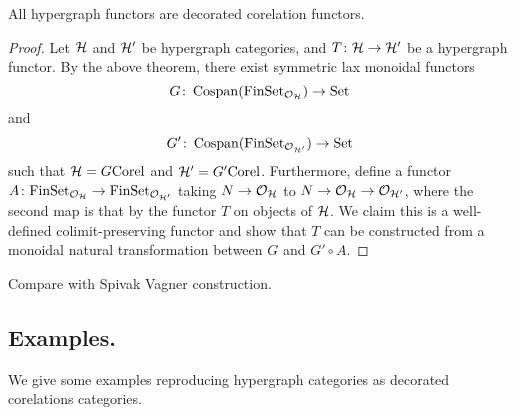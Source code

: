 \begin{theorem}
  All hypergraph functors are decorated corelation functors.
\end{theorem}
\begin{proof}
  Let $\mathcal H$ and $\mathcal H'$ be hypergraph categories, and $T{\colon} \mathcal H \to \mathcal
  H'$ be a hypergraph functor. By the above theorem, there exist symmetric lax
  monoidal functors 
  \[
    G{\colon} \operatorname{{Cospan}}(\mathrm{FinSet}_{\mathcal O_{\mathcal H}}) \to \mathrm{Set} 
  \]
  and 
  \[
    G'{\colon} \operatorname{{Cospan}}(\mathrm{FinSet}_{\mathcal O_{\mathcal H'}}) \to \mathrm{Set} 
  \]
  such that $\mathcal H = G\mathrm{Corel}$ and $\mathcal H' = G'\mathrm{Corel}$.
  Furthermore, define a functor $A{\colon} \mathrm{FinSet}_{\mathcal O_{\mathcal H}} \to \mathrm{FinSet}_{\mathcal
    O_{\mathcal H'}}$ taking $N \to \mathcal O_{\mathcal H}$ to $N \to \mathcal O_{\mathcal H} \to \mathcal
  O_{\mathcal H'}$, where the second map is that by the functor $T$ on objects of
  $\mathcal H$. We claim this is a well-defined colimit-preserving functor and show
  that $T$ can be constructed from a monoidal natural transformation between $G$
  and $G'\circ A$.
\end{proof}

Compare with Spivak Vagner construction.

\subsection{Examples.}
We give some examples reproducing hypergraph categories as decorated corelations
categories.

